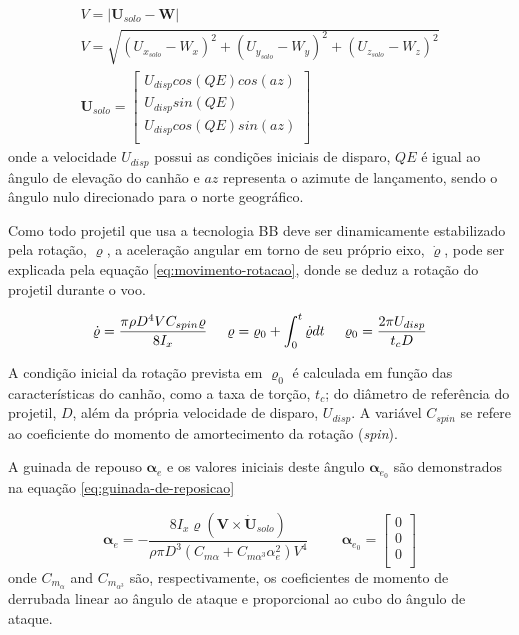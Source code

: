 \begin{gather}
    \label{eq:Vvel}
    V = |\boldsymbol{U}_{solo} - \boldsymbol{W}| \\ 
    \label{eq:Vmag}
    V = \sqrt{(U_{x_{solo}}-W_{x})^2 + (U_{y_{solo}}-W_{y})^2 + (U_{z_{solo}}-W_{z})^2} \\
    \label{eq:Uvec}
    \boldsymbol{U}_{solo} = \begin{bmatrix} 
        U_{disp}cos(QE)cos(az) \\
        U_{disp}sin(QE)\\
        U_{disp}cos(QE)sin(az) \\
    \end{bmatrix}
\end{gather}
%
onde a velocidade \(U_{disp}\) possui as condições iniciais de disparo, \(QE\) é igual ao ângulo de elevação do canhão e \(az\) representa o azimute de lançamento, sendo o ângulo nulo direcionado para o norte geográfico.

Como todo projetil que usa a tecnologia BB deve ser dinamicamente estabilizado pela rotação, \(\varrho\), a aceleração angular em torno de seu próprio eixo, \(\dot{\varrho}\), pode ser explicada pela equação \ref{eq:movimento-rotacao}, donde se deduz a rotação do projetil durante o voo.

\begin{equation}
    \label{eq:movimento-rotacao}
    \dot{\varrho} = \frac{\pi\rho D^{4}VC_{spin}\varrho}{8I_{x}} 
    \hspace{0.5cm}
    \varrho = \varrho_{0} + \int_{0}^{t}\dot{\varrho}dt 
    \hspace{0.5cm}
    \varrho_{0} = \frac{2\pi U_{disp}}{t_{c}D} 
\end{equation}

A condição inicial da rotação prevista em \(\varrho_{0}\) é calculada em função das características do canhão, como a taxa de torção, \(t_c\); do diâmetro de referência do projetil, \(D\), além da própria velocidade de disparo, \(U_{disp}\). A variável \(C_{spin}\) se refere ao coeficiente do momento de amortecimento da rotação (\textit{spin}).

A guinada de repouso \(\boldsymbol{\alpha}_{e}\) e os valores iniciais deste ângulo \(\boldsymbol{\alpha}_{e_{0}}\) são demonstrados na equação \ref{eq:guinada-de-reposicao}

\begin{equation}
	\label{eq:guinada-de-reposicao}
	 \boldsymbol{\alpha}_{e} = -\frac{8I_{x}\varrho(\boldsymbol{V}\times\dot{\boldsymbol{U}}_{solo})}{\rho\pi D^{3}(C_{m\alpha} + C_{m\alpha^{3}}\alpha_{e}^2)V^{4}}
	 \hspace{1cm}
	 \boldsymbol{\alpha}_{e_{0}} =
    \begin{bmatrix} 
        0 \\
        0 \\
        0 \\
    \end{bmatrix}
\end{equation}
%
onde \(C_{m_{\alpha}}\) and \(C_{m_{\alpha^3}}\) são, respectivamente, os coeficientes de momento de derrubada linear ao ângulo de ataque e proporcional ao cubo do ângulo de ataque.

